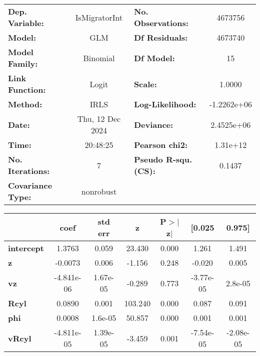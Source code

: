 \begin{center}
\begin{tabular}{lclc}
\toprule
\textbf{Dep. Variable:}   &  IsMigratorInt   & \textbf{  No. Observations:  } &   4673756    \\
\textbf{Model:}           &       GLM        & \textbf{  Df Residuals:      } &   4673740    \\
\textbf{Model Family:}    &     Binomial     & \textbf{  Df Model:          } &        15    \\
\textbf{Link Function:}   &      Logit       & \textbf{  Scale:             } &     1.0000   \\
\textbf{Method:}          &       IRLS       & \textbf{  Log-Likelihood:    } & -1.2262e+06  \\
\textbf{Date:}            & Thu, 12 Dec 2024 & \textbf{  Deviance:          } &  2.4525e+06  \\
\textbf{Time:}            &     20:48:25     & \textbf{  Pearson chi2:      } &   1.31e+12   \\
\textbf{No. Iterations:}  &        7         & \textbf{  Pseudo R-squ. (CS):} &    0.1437    \\
\textbf{Covariance Type:} &    nonrobust     & \textbf{                     } &              \\
\bottomrule
\end{tabular}
\begin{tabular}{lcccccc}
                   & \textbf{coef} & \textbf{std err} & \textbf{z} & \textbf{P$> |$z$|$} & \textbf{[0.025} & \textbf{0.975]}  \\
\midrule
\textbf{intercept} &       1.3763  &        0.059     &    23.430  &         0.000        &        1.261    &        1.491     \\
\textbf{z}         &      -0.0073  &        0.006     &    -1.156  &         0.248        &       -0.020    &        0.005     \\
\textbf{vz}        &   -4.841e-06  &     1.67e-05     &    -0.289  &         0.773        &    -3.77e-05    &      2.8e-05     \\
\textbf{Rcyl}      &       0.0890  &        0.001     &   103.240  &         0.000        &        0.087    &        0.091     \\
\textbf{phi}       &       0.0008  &      1.6e-05     &    50.857  &         0.000        &        0.001    &        0.001     \\
\textbf{vRcyl}     &   -4.811e-05  &     1.39e-05     &    -3.459  &         0.001        &    -7.54e-05    &    -2.08e-05     \\

\end{tabular}
\end{center}
